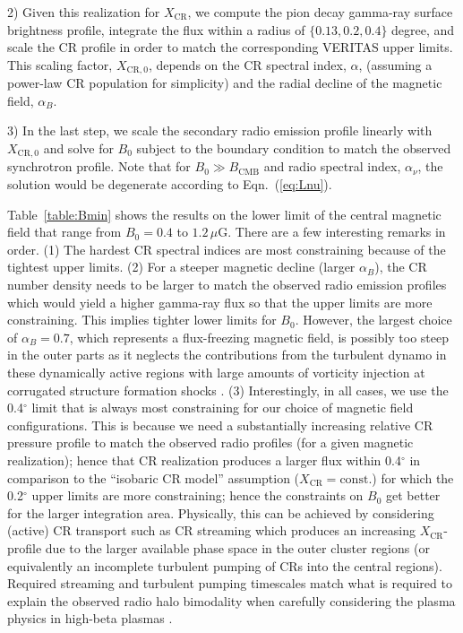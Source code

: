\documentclass[12pt,manuscript]{aastex}
\newcommand{\rmn}{\mathrm}
\newcommand{\CR}{\mathrm{CR}}
\begin{document}
2) Given this realization for $X_\CR$, we compute the pion decay gamma-ray
surface brightness profile, integrate the flux within a radius of $\{0.13, 0.2,
0.4\}$ degree, and scale the CR profile in order to match the corresponding
VERITAS upper limits.  This scaling factor, $X_{\CR,0}$, depends on the CR
spectral index, $\alpha$, (assuming a power-law CR population for simplicity) and
the radial decline of the magnetic field, $\alpha_B$.

3) In the last step, we scale the secondary radio emission profile linearly
with $X_{\CR,0}$ and solve for $B_0$ subject to the boundary condition to match
the observed synchrotron profile. Note that for $B_0 \gg B_\rmn{CMB}$ and radio
spectral index, $\alpha_\nu$, the solution would be degenerate according to
Eqn.~(\ref{eq:Lnu}). 

Table~\ref{table:Bmin} shows the results on the lower limit of the central
magnetic field that range from $B_0 = 0.4$ to $1.2\,\mu$G. There are a few
interesting remarks in order.  (1) The hardest CR spectral indices are most
constraining because of the tightest upper limits.  (2) For a steeper magnetic decline
(larger $\alpha_B$), the CR number density needs to be larger to match the
observed radio emission profiles which would yield a higher gamma-ray flux so
that the upper limits are more constraining. This implies tighter lower limits for $B_0$.
However, the largest choice of $\alpha_B=0.7$, which represents a flux-freezing
magnetic field, is possibly too steep in the outer parts as it neglects the
contributions from the turbulent dynamo in these dynamically active regions with
large amounts of vorticity injection at corrugated structure formation shocks
\citep[as observationally inferred for the first time
by][]{article:PfrommerJones:2011}.  (3) Interestingly, in all cases, we use the
0.4$^\circ$ limit that is always most constraining for our choice of magnetic
field configurations.  This is because we need a substantially increasing
relative CR pressure profile to match the observed radio profiles (for a given
magnetic realization); hence that CR realization produces a larger flux within
0.4$^\circ$ in comparison to the ``isobaric CR model'' assumption ($X_\CR =
\rmn{const.}$) for which the 0.2$^\circ$ upper limits are more constraining;
hence the constraints on $B_0$ get better for the larger integration area.
Physically, this can be achieved by considering (active) CR transport such as CR
streaming which produces an increasing $X_\CR$-profile due to the larger
available phase space in the outer cluster regions (or equivalently an
incomplete turbulent pumping of CRs into the central regions).  Required
streaming and turbulent pumping timescales match what is required to explain the
observed radio halo bimodality when carefully considering the plasma physics in
high-beta plasmas \citep{article:EnsslinPfrommerMiniatiSubramanian:2011}.
\end{document}
